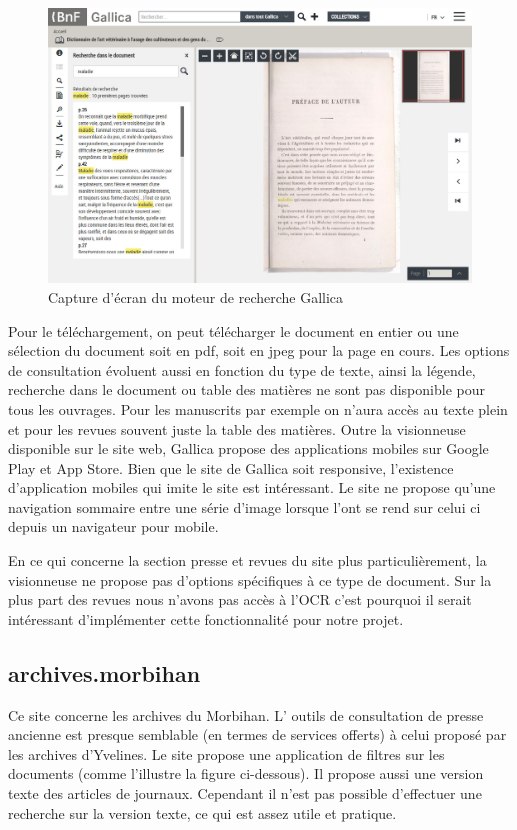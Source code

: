         \begin{figure}[ht!]
            \centering
            \includegraphics[width=1\textwidth]{figure/screenshot_gallica.jpg}
            \caption{Capture d'écran du moteur de recherche Gallica}
            \label{fig:gallica}
        \end{figure}

        Pour le téléchargement, on peut télécharger le document en entier ou une sélection du document soit en pdf,
        soit en jpeg pour la page en cours. Les options de consultation évoluent aussi en fonction du type de texte,
        ainsi la légende, recherche dans le document ou table des matières ne sont pas disponible pour tous les ouvrages.
        Pour les manuscrits par exemple on n’aura accès au texte plein et pour les revues souvent juste la table des matières.
        Outre la visionneuse disponible sur le site web, Gallica propose des applications mobiles sur Google Play et App Store.
        Bien que le site de Gallica soit responsive, l'existence d’application mobiles qui imite le site est intéressant.
        Le site ne propose qu’une navigation sommaire entre une série d’image lorsque l’ont se rend sur celui ci depuis un navigateur pour mobile.

        En ce qui concerne la section presse et revues du site plus particulièrement, la visionneuse ne propose
        pas d’options spécifiques à ce type de document. Sur la plus part des revues nous n’avons pas accès à l’OCR
        c’est pourquoi il serait intéressant d’implémenter cette fonctionnalité pour notre projet.

        \subsection{archives.morbihan}
        \label{subsec:morbihan}
        Ce site concerne les archives du Morbihan. L’ outils de consultation de presse ancienne est presque semblable
        (en termes de services offerts) à celui proposé par les archives d’Yvelines. Le site propose une application
        de filtres sur les documents (comme l’illustre la figure ci-dessous). Il propose aussi une version texte des
        articles de journaux. Cependant il n’est pas possible d’effectuer une recherche sur la version texte,
        ce qui est assez utile et pratique.

